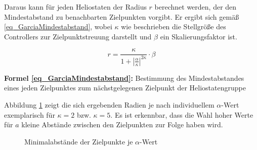 Daraus kann für jeden Heliostaten der Radius $r$ berechnet werden, der den Mindestabstand zu benachbarten Zielpunkten vorgibt.
Er ergibt sich gemäß \ref{eq_GarciaMindestabstand}, wobei $\kappa$ wie beschrieben die Stellgröße des Controllers zur Zielpunktstreuung darstellt und $\beta$ ein Skalierungsfaktor ist.

\begin{equation} \label{eq_GarciaMindestabstand}
    r=\frac{\kappa}{1+\left|\frac{\alpha}{\kappa}\right|^{2\kappa}}\cdot\beta
\end{equation}
\begin{center}
    \begin{varwidth}{0.95\textwidth}
\small{\textsf{\textbf{Formel \ref{eq_GarciaMindestabstand}:}} Bestimmung des Mindestabstandes eines jeden Zielpunktes zum nächstgelegenen Zielpunkt der Heliostatengruppe}
    \end{varwidth}
\end{center}

Abbildung \ref{fig_Verteilunglpha} zeigt die sich ergebenden Radien je nach individuellem $\alpha$-Wert exemplarisch für $\kappa=2$ bzw. $\kappa=5$.
Es ist erkennbar, dass die Wahl hoher Werte für $a$ kleine Abstände zwischen den Zielpunkten zur Folge haben wird.

\begin{figure}[h!]
    \centering
    \setlength{\fboxsep}{1pt}
    \setlength{\fboxrule}{1pt}
\caption[Minimalabstände der Zielpunkte je $\alpha$-Wert]{Minimalabstände der Zielpunkte je $\alpha$-Wert \cite[S.9]{Garcia2}}
    \label{fig_Verteilunglpha}
\end{figure}

